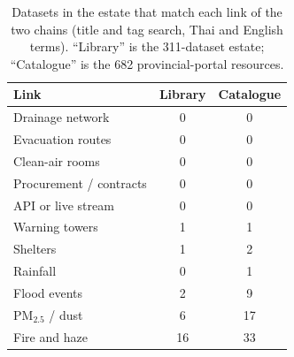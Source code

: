 \documentclass[10pt,twocolumn,a4paper]{article}
\begin{document}
\begin{table}[!t]
\centering\small
\caption{Datasets in the estate that match each link of the two chains (title and tag search, Thai and English terms). ``Library''  is the 311-dataset estate; ``Catalogue''  is the 682 provincial-portal resources.}\label{tab:links}
\begin{tabular}{@{}lcc@{}}
\toprule
\textbf{Link} & \textbf{Library} & \textbf{Catalogue}\\\midrule
Drainage network & 0 & 0\\
Evacuation routes & 0 & 0\\
Clean-air rooms & 0 & 0\\
Procurement / contracts & 0 & 0\\
API or live stream & 0 & 0\\
Warning towers & 1 & 1\\
Shelters & 1 & 2\\
Rainfall & 0 & 1\\
Flood events & 2 & 9\\
PM$_{2.5}$ / dust & 6 & 17\\
Fire and haze & 16 & 33\\\bottomrule
\end{tabular}
\end{table}
\end{document}
